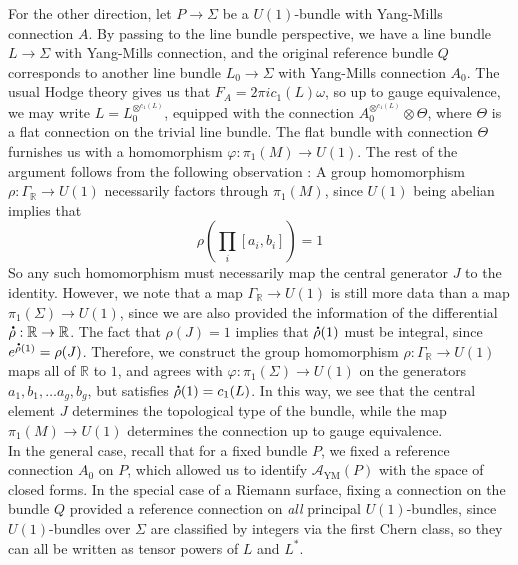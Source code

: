 \documentclass[psamsfonts, 12pt]{amsart}
\theoremstyle{definition}
\theoremstyle{remark}
\newcommand{\R}{\mathbb{R}}
\newcommand*{\dt}[1]{%
   \accentset{\mbox{\large\bfseries .}}{#1}}
\begin{document}
For the other direction, let $P \to \Sigma$ be a $U(1)$-bundle with Yang-Mills
connection $A$. By passing to the line bundle perspective, we have a line
bundle $L \to \Sigma$ with Yang-Mills connection, and the original reference bundle
$Q$ corresponds to another line bundle $L_0 \to \Sigma$ with Yang-Mills connection
$A_0$. The usual Hodge theory gives us that $F_A = 2\pi i c_1(L) \omega$, so
up to gauge equivalence, we may write $L = L_0^{\otimes^{c_1(L)}}$, equipped with
the connection $A_0^{\otimes^{c_1(L)}} \otimes \Theta$, where $\Theta$ is a flat
connection on the trivial line bundle. The flat bundle with connection $\Theta$
furnishes us with a homomorphism $\varphi : \pi_1(M) \to U(1)$. The rest of the
argument follows from the following observation : A group homomorphism
$\rho : \Gamma_\R \to U(1)$ necessarily factors through $\pi_1(M)$, since
$U(1)$ being abelian implies that
\[
\rho\left(\prod_i [a_i,b_i]\right) = 1
\]
So any such homomorphism must necessarily map the central generator $J$ to the
identity. However, we note that a map $\Gamma_\R \to U(1)$ is still more
data than a map $\pi_1(\Sigma) \to U(1)$, since we are also provided the information
of the differential $\dt{\rho} : \R \to \R$. The fact that $\rho(J) = 1$ implies
that $\dt{\rho}(1)$ must be integral, since $e^{\dt{\rho}(1)} = \rho(J)$. Therefore,
we construct the group homomorphism $\rho : \Gamma_\R \to U(1)$ maps all
of $\R$ to $1$, and agrees with $\varphi : \pi_1(\Sigma) \to U(1)$ on the generators
$a_1,b_1,\ldots a_g,b_g$, but satisfies $\dt{\rho}(1) = c_1(L)$. In this way, we
see that the central element $J$ determines the topological type of the bundle,
while the map $\pi_1(M) \to U(1)$ determines the connection up to gauge equivalence. \\

In the general case, recall that for a fixed bundle $P$, we fixed a reference
connection $A_0$ on $P$, which allowed us to identify $\mathscr{A}_{\text{YM}}(P)$ with
the space of closed forms. In the special case of a Riemann surface, fixing a connection
on the bundle $Q$ provided a reference connection on \emph{all} principal
$U(1)$-bundles, since $U(1)$-bundles over $\Sigma$ are classified by integers via the
first Chern class, so they can all be written as tensor powers of $L$ and $L^*$.
%
\newpage
%
\nocite{*}
%
\printbibliography
%
\end{document}

